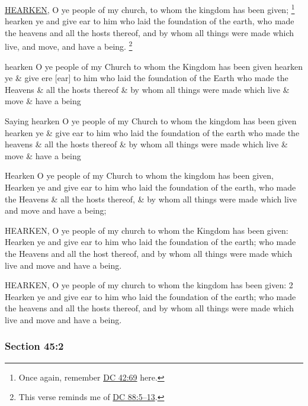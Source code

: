 		\hyperref[HEARKEN]{HEARKEN}, O ye people of my church, to whom the kingdom has been given;%
			\footnote{%
				Once again, remember \hyperref[DC42-69]{DC 42:69} here.
				}
		hearken ye and give ear to him who laid the foundation of the earth, who made the heavens and all the hosts thereof, and by whom all things were made which live, and move, and have a being.%
		\footnote{%
			This verse reminds me of \hyperref[DC88-5]{DC 88:5--13}.
			} 
		
		\begin{framed}
		\scriptsize
			\begin{compactdesc}
				\item[JSP] hearken O ye people of my Church to whom the Kingdom has been given hearken ye \& give ere [ear] to him who laid the foundation of the Earth who made the Heavens \& all the hosts thereof \& by whom all things were made which live \& move \& have a being
				\item[Partridge] Saying hearken O ye people of my Church to whom the kingdom has been given hearken ye \& give ear to him who laid the foundation of the earth who made the heavens \& all the hosts thereof \& by whom all things were made which live \& move \& have a being
				\item[McLellin] Hearken O ye people of my Church to whom the kingdom has been given, Hearken ye and give ear to him who laid the foundation of the earth, who made the Heavens \& all the hosts thereof, \& by whom all things were made which live and move and have a being;
				\item[EMS] HEARKEN, O ye people of my church to whom the Kingdom has been given: Hearken ye and give ear to him who laid the foundation of the earth; who made the Heavens and all the host thereof, and by whom all things were made which live and move and have a being.
				\item[BC] HEARKEN, O ye people of my church to whom the kingdom has been given: 2 Hearken ye and give ear to him who laid the foundation of the earth; who made the heavens and all the hosts thereof, and by whom all things were made which live and move and have a being.
			\end{compactdesc}
		\end{framed}
		
	\subsubsection{Section 45:2} %
		\label{DC45-2}

